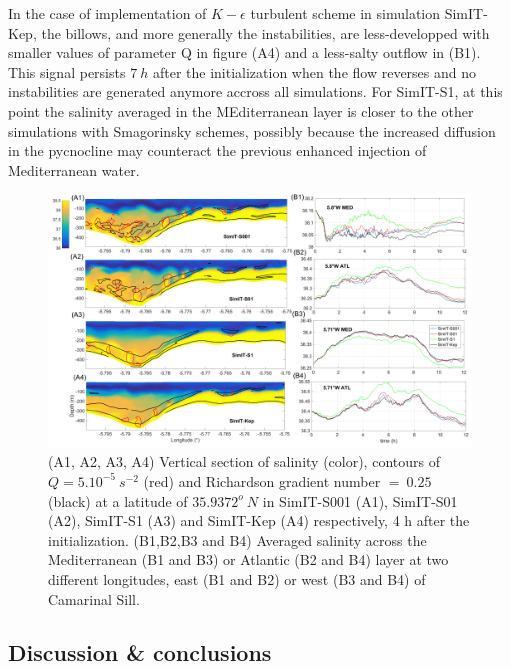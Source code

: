 In the case of implementation of $K-\epsilon$ turbulent scheme in simulation SimIT-Kep, the billows, and more generally the instabilities, are less-developped with smaller values of parameter Q in figure (A4) and a less-salty outflow in (B1). This signal persists $7\ h$ after the initialization when the flow reverses and no instabilities are generated anymore accross all simulations. For SimIT-S1, at this point the salinity averaged in the MEditerranean layer is closer to the other simulations with Smagorinsky schemes, possibly because the increased diffusion in the pycnocline may counteract the previous enhanced injection of Mediterranean water.

\begin{figure}[!h]
 \includegraphics[width=\textwidth]{./GBR3D/Figsmago.png}
 \caption { (A1, A2, A3, A4) Vertical section of salinity (color), contours of $Q = 5.10^{-5} \ s^{-2}$ (red) and Richardson gradient number $=\ 0.25$ (black) at a latitude of $35.9372^o\ N$ in SimIT-S001 (A1), SimIT-S01 (A2), SimIT-S1 (A3) and SimIT-Kep (A4) respectively, 4 h after the initialization. (B1,B2,B3 and B4) Averaged salinity across the Mediterranean (B1 and B3) or Atlantic (B2 and B4) layer at two different longitudes, east (B1 and B2) or west (B3 and B4) of Camarinal Sill.}
 \label{Fig3Dsch}
\end{figure}

\subsection{Discussion \& conclusions}
